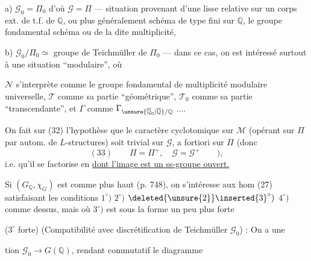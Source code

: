 a) $\mathcal{G}_0=\Pi_0$ d'où $\mathcal{G}=\Pi$ --- situation provenant d'une  lisse relative sur un corps  ext. de t.f. de $\mathbb{Q}$, ou plus généralement  schéma   de type fini sur $\mathbb{Q}$,   le groupe fondamental  schéma ou de la dite multiplicité,

b) $\mathcal{G}_0/\Pi_0\simeq$ groupe de Teichmüller de $\Pi_0$  --- dans ce cas, on est intéressé surtout à une situation ``modulaire'', où

$\mathcal{N}$ s'interprète comme le groupe fondamental de  multiplicité modulaire universelle, $\mathcal{T}$ comme sa partie ``géométrique'', $\mathcal{T}_0$ comme sa partie ``transcendante'', et $\Gamma$ comme $\Gamma_{\unsure{\overline{\mathbb{Q}}_0|\overline{\mathbb{Q}}}/\mathbb{Q}}$ ....

On fait sur (32) l'hypothèse que le caractère cyclotomique sur $\mathcal{M}$ (opérant sur $\Pi$ par autom. de $L$-structures) soit trivial sur $\mathcal{G}$, a fortiori sur $\Pi$ (donc
\[
(33)\qquad \Pi=\Pi^{+},\quad \mathcal{G}=\mathcal{G}^{+}\qquad ),
\]
i.e. qu'il se factorise en
\uline{dont l'image est un ss-groupe ouvert.}

Si $(G_{\mathbb{Q}},\chi_G)$ est comme plus haut (p. 748), on s'intéresse aux hom (27)
satisfaisant les conditions $1^{\circ})$ $2^{\circ})$ $\deleted{\unsure{2}}\inserted{3}^{\circ})$ $4^{\circ})$ comme dessus, mais où $3^{\circ})$ est  sous la forme un peu plus forte

($3^{\circ}$ forte) (Compatibilité avec discrétification de Teichmüller $\mathcal{G}_0$) : On a une 

tion $\mathcal{G}_0\longrightarrow G(\mathbb{Q})$, rendant  commutatif le diagramme

